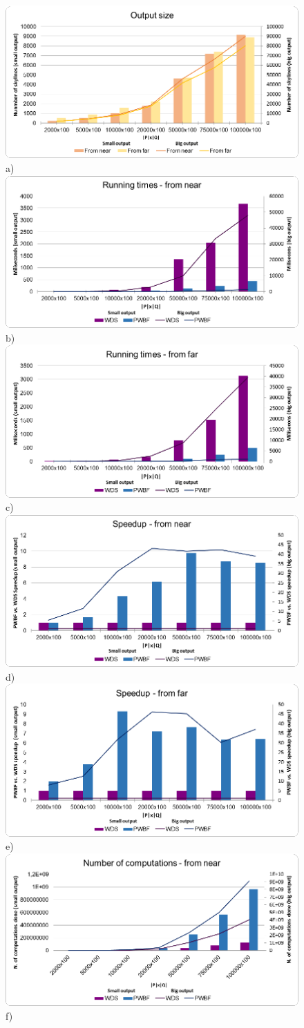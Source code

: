 \documentclass[11pt,onecolumn]{elsart3p}
\begin{document}
    \begin{figure}[]
      \begin{center}
        \includegraphics[width=0.45\linewidth]{img/osize_nf_sb.eps}a) \\
        \includegraphics[width=0.45\linewidth]{img/rt_n_sb.eps} b)
        \includegraphics[width=0.45\linewidth]{img/rt_f_sb.eps} c)
        \includegraphics[width=0.45\linewidth]{img/sp_n_sb.eps} d)
        \includegraphics[width=0.45\linewidth]{img/sp_f_sb.eps} e)
        \includegraphics[width=0.45\linewidth]{img/comp_n_sb.eps} f)

\end{center}
\end{figure}
\end{document}
